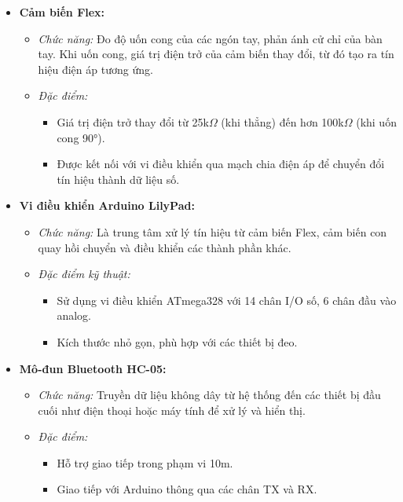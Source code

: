 \begin{itemize}
    \item \textbf{Cảm biến Flex:}
    \begin{itemize}
        \item \textit{Chức năng:} Đo độ uốn cong của các ngón tay, phản ánh cử chỉ của bàn tay. Khi uốn cong, giá trị điện trở của cảm biến thay đổi, từ đó tạo ra tín hiệu điện áp tương ứng.
        \item \textit{Đặc điểm:}
        \begin{itemize}
            \item Giá trị điện trở thay đổi từ 25k$\Omega$ (khi thẳng) đến hơn 100k$\Omega$ (khi uốn cong 90°).
            \item Được kết nối với vi điều khiển qua mạch chia điện áp để chuyển đổi tín hiệu thành dữ liệu số.
        \end{itemize}
    \end{itemize}

    \item \textbf{Vi điều khiển Arduino LilyPad:}
    \begin{itemize}
        \item \textit{Chức năng:} Là trung tâm xử lý tín hiệu từ cảm biến Flex, cảm biến con quay hồi chuyển và điều khiển các thành phần khác.
        \item \textit{Đặc điểm kỹ thuật:}
        \begin{itemize}
            \item Sử dụng vi điều khiển ATmega328 với 14 chân I/O số, 6 chân đầu vào analog.
            \item Kích thước nhỏ gọn, phù hợp với các thiết bị đeo.
        \end{itemize}
    \end{itemize}

    \item \textbf{Mô-đun Bluetooth HC-05:}
    \begin{itemize}
        \item \textit{Chức năng:} Truyền dữ liệu không dây từ hệ thống đến các thiết bị đầu cuối như điện thoại hoặc máy tính để xử lý và hiển thị.
        \item \textit{Đặc điểm:}
        \begin{itemize}
            \item Hỗ trợ giao tiếp trong phạm vi 10m.
            \item Giao tiếp với Arduino thông qua các chân TX và RX.
        \end{itemize}
    \end{itemize}


\end{itemize}
